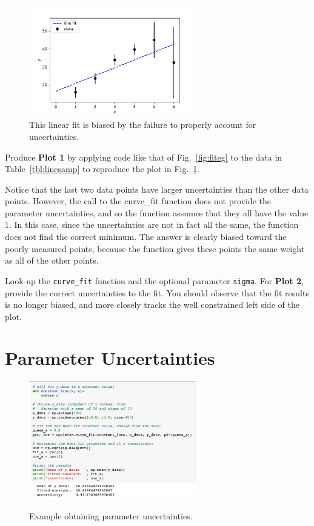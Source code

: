\begin{figure}[htbp]
\begin{center}
\includegraphics[width=0.65\textwidth]{figs/fitting/bias.pdf} 
\caption{This linear fit is biased by the failure to properly account for uncertainties.}
\label{fig:fitbias}
\end{center}
\end{figure}

Produce {\bf Plot 1} by applying code like that of Fig.~\ref{fig:fiteg}
to the data in Table~\ref{tbl:linesamp} to reproduce the plot in
Fig.~\ref{fig:fitbias}.  

Notice that the last two data points have larger uncertainties than
the other data points.  However, the call to the {curve{\_}fit}
function does not provide the parameter uncertainties, and so the
function assumes that they all have the value $1$.  In this case,
since the uncertainties are not in fact all the same, the function
does not find the correct minimum.  The answer is clearly biased
toward the poorly measured points, because the function gives these
points the same weight as all of the other points.

Look-up the {\tt curve{\_}fit} function and the optional parameter
{\tt sigma}.  For {\bf Plot 2}, provide the correct uncertainties to
the fit.  You should observe that the fit results is no longer biased,
and more closely tracks the well constrained left side of the plot.

\section{Parameter Uncertainties}

\begin{figure}[htbp]
\begin{center}
\includegraphics[width=0.65\textwidth]{figs/fitting/uncertainties.png} \\
\caption{Example obtaining parameter uncertainties.}
\label{fig:fitunc}
\end{center}
\end{figure}


